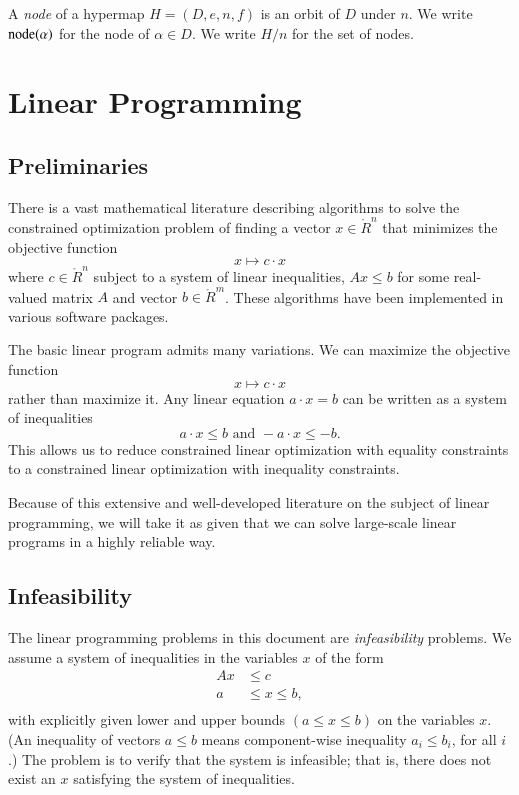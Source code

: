 \begin{definition}  A {\it node} of a hypermap $H=(D,e,n,f)$ is an orbit of $D$
under $n$.  We write ${\operatorname{node}}(\alpha)$ for the node of
$\alpha\in D$.  We write $H/n$ for the set of nodes.
\end{definition}


\section{Linear Programming}


\subsection{Preliminaries}

There is a vast mathematical literature describing algorithms to
solve the constrained optimization problem of finding a vector
$x\in\ring{R}^n$ that minimizes the objective function
    $$x\mapsto c\cdot x$$
where $c\in\ring{R}^n$ subject to a system of linear inequalities,
$A x\le b$ for some real-valued matrix $A$ and vector $b\in
\ring{R}^m$.  These algorithms have been implemented in various
software packages.

The basic linear program admits many variations.  We can maximize
the objective function
$$x \mapsto c\cdot x$$ rather than maximize it.
Any linear equation
    $a\cdot x = b$ can be written as a system of inequalities
        $$a \cdot x \le b \text{ and } -a \cdot x \le -b.$$
This allows us to reduce constrained linear optimization with
equality constraints to a constrained linear optimization with
inequality constraints.

Because of this extensive and well-developed literature on the
subject of linear programming, we will take it as given that we
can solve large-scale linear programs in a highly reliable way.

\subsection{Infeasibility}


The linear programming problems in this document are {\it
infeasibility} problems.  We assume a system of inequalities in
the variables $x$ of the form
    \begin{equation}
    \label{eqn:lpsys}
    \begin{array}{lll}
    A x &\le c\\
    a &\le x \le b,\\
    \end{array}
    \end{equation}
with explicitly given lower and upper bounds $(a\le x\le b)$ on
the variables $x$. (An inequality of vectors $a\le b$ means
component-wise inequality $a_i\le b_i$, for all $i$.) The problem
is to verify that the system is infeasible; that is, there does
not exist an $x$ satisfying the system of inequalities.

